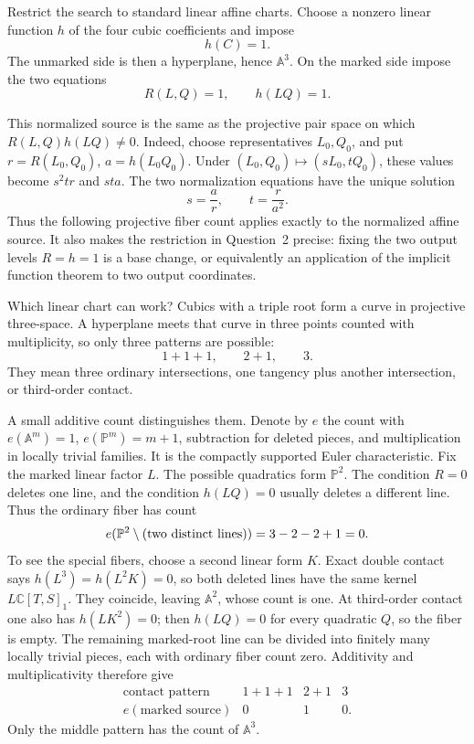 \documentclass[11pt,a4paper]{article}
\numberwithin{equation}{section}
\theoremstyle{definition}
\theoremstyle{remark}
\newcommand{\A}{\mathbb A}
\newcommand{\C}{\mathbb C}
\newcommand{\PP}{\mathbb P}
\newenvironment{modelanswer}
  {\par\smallskip\noindent{\color{modelgreen}\bfseries MODEL}\par\smallskip}
  {\par\medskip}
\begin{document}
\begin{modelanswer}
Restrict the search to standard linear affine charts.  Choose a nonzero
linear function \(h\) of the four cubic coefficients and impose
\[
  h(C)=1.
\]
The unmarked side is then a hyperplane, hence \(\A^3\).  On the marked side
impose the two equations
\begin{equation}\label{eq:normalized-source}
  R(L,Q)=1,
  \qquad h(LQ)=1.
\end{equation}

This normalized source is the same as the projective pair space on which
\(R(L,Q)h(LQ)\ne0\).  Indeed, choose representatives \(L_0,Q_0\), and put
\(r=R(L_0,Q_0)\), \(a=h(L_0Q_0)\).  Under
\((L_0,Q_0)\mapsto(sL_0,tQ_0)\), these values become \(s^2tr\) and
\(sta\).  The two normalization equations have the unique solution
\begin{equation}\label{eq:unique-scaling}
  s=\frac{a}{r},
  \qquad
  t=\frac{r}{a^2}.
\end{equation}
Thus the following projective fiber count applies exactly to the normalized
affine source.  It also makes the restriction in Question~2 precise: fixing
the two output levels \(R=h=1\) is a base change, or equivalently an
application of the implicit function theorem to two output coordinates.

Which linear chart can work?  Cubics with a triple root form a curve in
projective three-space.  A hyperplane meets that curve in three points
counted with multiplicity, so only three patterns are possible:
\[
  1+1+1,
  \qquad 2+1,
  \qquad 3.
\]
They mean three ordinary intersections, one tangency plus another
intersection, or third-order contact.

A small additive count distinguishes them.  Denote by \(e\) the count with
\(e(\A^m)=1\), \(e(\PP^m)=m+1\), subtraction for deleted pieces, and
multiplication in locally trivial families.  It is the compactly supported
Euler characteristic.  Fix the marked linear factor \(L\).  The possible
quadratics form \(\PP^2\).  The condition \(R=0\)
deletes one line, and the condition \(h(LQ)=0\) usually deletes a different
line.  Thus the ordinary fiber has count
\[
  e(\PP^2\setminus(\hbox{two distinct lines}))=3-2-2+1=0.
\]
To see the special fibers, choose a second linear form \(K\).  Exact double
contact says \(h(L^3)=h(L^2K)=0\), so both deleted lines have the same kernel
\(L\C[T,S]_1\).  They coincide, leaving \(\A^2\), whose count is one.  At
third-order contact one also has \(h(LK^2)=0\); then \(h(LQ)=0\) for every
quadratic \(Q\), so the fiber is empty.  The remaining marked-root line can
be divided into finitely many locally trivial pieces, each with ordinary
fiber count zero.  Additivity and multiplicativity therefore give
\begin{equation}\label{eq:contact-table}
\begin{array}{c|ccc}
\text{contact pattern}&1+1+1&2+1&3\\ \hline
e(\text{marked source})&0&1&0.
\end{array}
\end{equation}
Only the middle pattern has the count of \(\A^3\).


\end{modelanswer}
\end{document}
